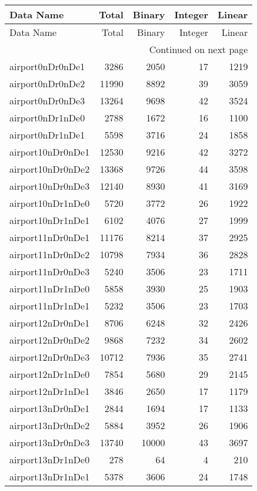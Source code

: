 \begin{longtable}{lrrrr}
\toprule
Data Name & Total & Binary & Integer & Linear \\
\midrule
\endfirsthead
\toprule
Data Name & Total & Binary & Integer & Linear \\
\midrule
\endhead
\midrule
\multicolumn{5}{r}{Continued on next page} \\
\midrule
\endfoot
\bottomrule
\endlastfoot
airport0nDr0nDe1 & 3286 & 2050 & 17 & 1219 \\
airport0nDr0nDe2 & 11990 & 8892 & 39 & 3059 \\
airport0nDr0nDe3 & 13264 & 9698 & 42 & 3524 \\
airport0nDr1nDe0 & 2788 & 1672 & 16 & 1100 \\
airport0nDr1nDe1 & 5598 & 3716 & 24 & 1858 \\
airport10nDr0nDe1 & 12530 & 9216 & 42 & 3272 \\
airport10nDr0nDe2 & 13368 & 9726 & 44 & 3598 \\
airport10nDr0nDe3 & 12140 & 8930 & 41 & 3169 \\
airport10nDr1nDe0 & 5720 & 3772 & 26 & 1922 \\
airport10nDr1nDe1 & 6102 & 4076 & 27 & 1999 \\
airport11nDr0nDe1 & 11176 & 8214 & 37 & 2925 \\
airport11nDr0nDe2 & 10798 & 7934 & 36 & 2828 \\
airport11nDr0nDe3 & 5240 & 3506 & 23 & 1711 \\
airport11nDr1nDe0 & 5858 & 3930 & 25 & 1903 \\
airport11nDr1nDe1 & 5232 & 3506 & 23 & 1703 \\
airport12nDr0nDe1 & 8706 & 6248 & 32 & 2426 \\
airport12nDr0nDe2 & 9868 & 7232 & 34 & 2602 \\
airport12nDr0nDe3 & 10712 & 7936 & 35 & 2741 \\
airport12nDr1nDe0 & 7854 & 5680 & 29 & 2145 \\
airport12nDr1nDe1 & 3846 & 2650 & 17 & 1179 \\
airport13nDr0nDe1 & 2844 & 1694 & 17 & 1133 \\
airport13nDr0nDe2 & 5884 & 3952 & 26 & 1906 \\
airport13nDr0nDe3 & 13740 & 10000 & 43 & 3697 \\
airport13nDr1nDe0 & 278 & 64 & 4 & 210 \\
airport13nDr1nDe1 & 5378 & 3606 & 24 & 1748 \\

\end{longtable}
